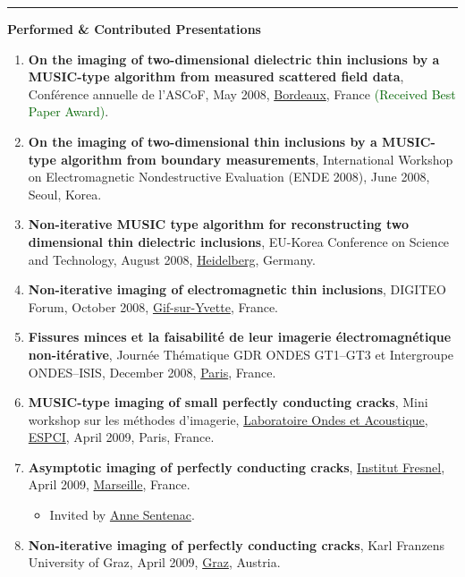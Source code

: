 \documentclass[10pt,A4]{article}
\newcommand{\cvsection}[1]
{
	\begin{center}
		\large\textcolor{sectcol}{\textbf{#1}}
	\end{center}
}
\begin{document}
\textcolor{softcol}{\hrule}

\cvsection{Performed \& Contributed Presentations}
\begin{enumerate}\renewcommand{\theenumi}{[P\arabic{enumi}]}
\renewcommand{\labelenumi}{\theenumi}
\item\label{P-ASCOF2008} \textbf{On the imaging of two-dimensional dielectric thin inclusions by a MUSIC-type algorithm from measured scattered field data}, Conf{\'e}rence annuelle de l'ASCoF, May 2008, \href{https://www.bordeaux.fr}{Bordeaux}, France \textcolor{darkgreen}{(Received Best Paper Award)}.
\item\label{P-ENDE2008} \textbf{On the imaging of two-dimensional thin inclusions by a MUSIC-type algorithm from boundary measurements},  International Workshop on Electromagnetic Nondestructive Evaluation (ENDE 2008), June 2008, Seoul, Korea.
\item\label{P-EKC2008} \textbf{Non-iterative MUSIC type algorithm for reconstructing two dimensional thin dielectric inclusions}, EU-Korea Conference on Science and Technology, August 2008, \href{https://www.heidelberg.de/}{Heidelberg}, Germany.
\item\label{P-DIGITEO2008} \textbf{Non-iterative imaging of electromagnetic thin inclusions}, DIGITEO Forum, October 2008, \href{https://www.ville-gif.fr/3/accueil.htm}{Gif-sur-Yvette}, France.
\item\label{P-GDR2008} \textbf{Fissures minces et la faisabilit\'e de leur imagerie \'electromagn\'etique non-it\'erative}, Journ\'ee Th\'ematique GDR ONDES GT1--GT3 et Intergroupe ONDES--ISIS, December 2008, \href{http://www.paris.fr}{Paris}, France.
\item\label{P-ESPCI2009} \textbf{MUSIC-type imaging of small perfectly conducting cracks}, Mini workshop sur les m\'ethodes d'imagerie, \href{http://www.loa.espci.fr/}{Laboratoire Ondes et Acoustique}, \href{http://www.espci.fr/}{ESPCI}, April 2009, Paris, France.
\item\label{P-FRESNEL2009} \textbf{Asymptotic imaging of perfectly conducting cracks}, \href{http://www.fresnel.fr/spip/}{Institut Fresnel}, April 2009, \href{https://www.marseille-tourisme.com/en/}{Marseille}, France.
\begin{itemize}
\item Invited by \href{http://www.fresnel.fr/perso/sentenac/}{Anne Sentenac}.
\end{itemize}
\item\label{P-GRAZ2009A} \textbf{Non-iterative imaging of perfectly conducting cracks}, Karl Franzens University of Graz, April 2009, \href{https://www.graz.at}{Graz}, Austria.

\end{enumerate}
\end{document}
